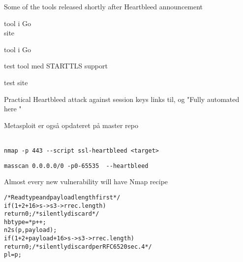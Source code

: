\documentclass[20pt,landscape,a4paper,footrule]{foils}
\begin{document}
\centerline{Some of the tools released shortly after Heartbleed announcement}
\begin{list2}
\item {} tool i Go\\
site 
\item {} tool i Go
\item {} test tool med STARTTLS support
\item {} test site
\item {} Practical Heartbleed attack against session keys links til,  og "Fully automated here "\\ 

\item Metasploit er også opdateret på master repo\\ \\
\end{list2}




\begin{list1}
\item \verb+nmap -p 443 --script ssl-heartbleed <target>+\\
\item \verb+masscan 0.0.0.0/0 -p0-65535  --heartbleed+\\
\end{list1}

\centerline{Almost every new vulnerability will have Nmap recipe}


\begin{alltt}
  /* Read type and payload length first */
    if (1 + 2 + 16 > s->s3->rrec.length)
        return 0; /* silently discard */
    hbtype = *p++;
    n2s(p, payload);
    if (1 + 2 + payload + 16 > s->s3->rrec.length)
        return 0; /* silently discard per RFC 6520 sec. 4 */
    pl = p;
\end{alltt}
\end{document}
